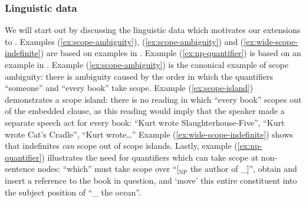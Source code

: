 \documentclass[10pt,a4paper]{llncs}
\begin{document}
\subsubsection*{Linguistic data}\label{sec:linguistic-data}
We will start out by discussing the linguistic data which motivates
our extensions to {\NLCL}.
Examples (\ref{ex:scope-ambiguity}), (\ref{ex:scope-ambiguity}) and
(\ref{ex:wide-scope-indefinite}) are based on examples in
\citet[][p.\ 608, 622]{szabolcsi2000}.
Example (\ref{ex:np-quantifier}) is based on an example in
\citet[][p.\ 208]{barker2015}.
%
%
%
Example (\ref{ex:scope-ambiguity}) is the canonical example of scope
ambiguity: there is ambiguity caused by the order in which the
quantifiers ``someone'' and ``every book'' take scope.
%
Example (\ref{ex:scope-island}) demonstrates a scope island:
there is no reading in which ``every book'' scopes out of the embedded
clause, as this reading would imply that the speaker made a separate
speech act for every book: ``Kurt wrote Slaughterhouse-Five'', ``Kurt
wrote Cat's Cradle'', ``Kurt wrote\ldots''
%
Example (\ref{ex:wide-scope-indefinite}) shows that indefinites
\emph{can} scope out of scope islands.
%
Lastly, example (\ref{ex:np-quantifier}) illustrates the need for
quantifiers which can take scope at non-sentence nodes: ``which'' must
take scope over ``[$_{\text{NP}}$ the author of \_]'', obtain and
insert a reference to the book in question, and `move' this entire
constituent into the subject position of ``\_ the ocean''.
\end{document}
